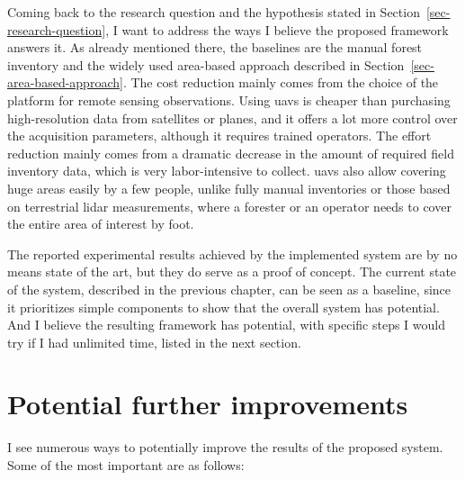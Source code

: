 Coming back to the research question and the hypothesis stated in Section~\ref{sec-research-question}, I want to address the ways I believe the proposed framework answers it.
As already mentioned there, the baselines are the manual forest inventory and the widely used area-based approach described in Section~\ref{sec-area-based-approach}.
The cost reduction mainly comes from the choice of the platform for remote sensing observations.
Using \glspl{uav} is cheaper than purchasing high-resolution data from satellites or planes, and it offers a lot more control over the acquisition parameters, although it requires trained operators.
The effort reduction mainly comes from a dramatic decrease in the amount of required field inventory data, which is very labor-intensive to collect.
\glspl{uav} also allow covering huge areas easily by a few people, unlike fully manual inventories or those based on terrestrial \gls{lidar} measurements, where a forester or an operator needs to cover the entire area of interest by foot.

The reported experimental results achieved by the implemented system are by no means state of the art, but they do serve as a proof of concept.
The current state of the system, described in the previous chapter, can be seen as a baseline, since it prioritizes simple components to show that the overall system has potential.
And I believe the resulting framework has potential, with specific steps I would try if I had unlimited time, listed in the next section.

\section{Potential further improvements}

I see numerous ways to potentially improve the results of the proposed system.
Some of the most important are as follows:

